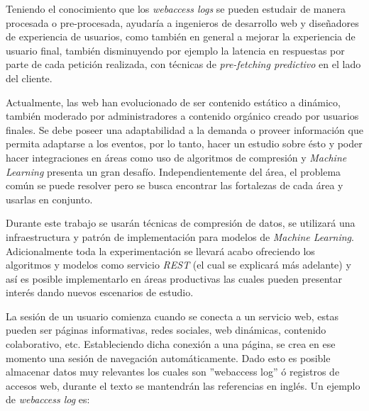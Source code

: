   Teniendo el conocimiento que los \emph{webaccess logs} se pueden estudair de manera procesada o pre-procesada, ayudaría a ingenieros de desarrollo web y diseñadores de experiencia de usuarios, como también en general a mejorar la experiencia de usuario final, también disminuyendo por ejemplo la latencia en respuestas por parte de cada petición realizada, con técnicas de \emph{pre-fetching predictivo} en el lado del cliente.
  

  Actualmente, las web han evolucionado de ser contenido estático a dinámico, también moderado por administradores a contenido orgánico creado por usuarios finales. Se debe poseer una adaptabilidad a la demanda o proveer información que permita adaptarse a los eventos, por lo tanto, hacer un estudio sobre ésto y poder hacer integraciones en áreas como uso de algoritmos de compresión y \emph{Machine Learning} presenta un gran desafío. Independientemente del área, el problema común  se puede resolver pero se busca encontrar las fortalezas de cada área y usarlas en conjunto. 

  Durante este trabajo se usarán técnicas de compresión de datos, se utilizará una infraestructura y patrón de implementación para modelos de \emph{Machine Learning}. Adicionalmente toda la experimentación se llevará acabo ofreciendo los algoritmos y modelos como servicio \emph{REST} (el cual se explicará más adelante) y así es posible implementarlo en áreas productivas las cuales pueden presentar interés dando nuevos escenarios de estudio.


  La sesión de un usuario comienza cuando se conecta a un servicio web, estas pueden ser páginas informativas, redes sociales, web dinámicas, contenido colaborativo, etc. Estableciendo dicha conexión a una página, se crea en ese momento una sesión de navegación automáticamente. Dado esto es posible almacenar datos muy relevantes los cuales son ''webaccess log'' ó registros de accesos web, durante el texto se mantendrán las referencias en inglés. Un ejemplo de \emph{webaccess log} es:

